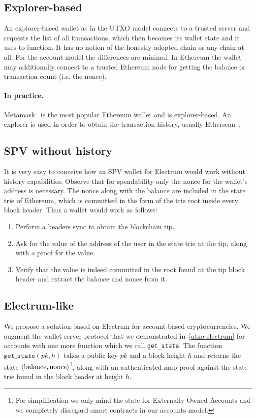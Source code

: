 \subsection{Explorer-based}
An explorer-based wallet as in the UTXO model connects to a trusted server and requests the list of all transactions, which then becomes its wallet state and it uses to function. It has no notion of the honestly adopted chain or any chain at all. For the account-model the differences are minimal. In Ethereum the wallet may additionally connect to a trusted Ethereum node for getting the balance or transaction count (i.e. the nonce).

\paragraph{In practice.}
Metamask~\cite{metamask} is the most popular Ethereum wallet and is explorer-based. An explorer is used in order to obtain the transaction history, usually Etherscan~\cite{etherscan}.

\subsection{SPV without history}
It is very easy to conceive how an SPV wallet for Electrum would work without history capabilities. Observe that for spendability only the nonce for the wallet's address is necessary. The nonce along with the balance are included in the state trie of Ethereum, which is committed in the form of the trie root inside every block header. Thus a wallet would work as follows:

\begin{enumerate}
    \item Perform a headers sync to obtain the blockchain tip.
    \item Ask for the value of the address of the user in the state trie at the tip, along with a proof for the value.
    \item Verify that the value is indeed committed in the root found at the tip block header and extract the balance and nonce from it.
\end{enumerate}

\subsection{Electrum-like}
We propose a solution based on Electrum for account-based cryptocurrencies. We augment the wallet server protocol that we demonstrated in~\cref{utxo-electrum} for accounts with one more function which we call \texttt{get\_state}. The function $\texttt{get\_state}(pk, h)$ takes a public key $pk$ and a block height $h$ and returns the state $\langle\text{balance}, \text{nonce}\rangle$\footnote{For simplification we only mind the state for Externally Owned Accounts and we completely disregard smart contracts in our accounts model.}, along with an authenticated map proof against the state trie found in the block header at height $h$.

